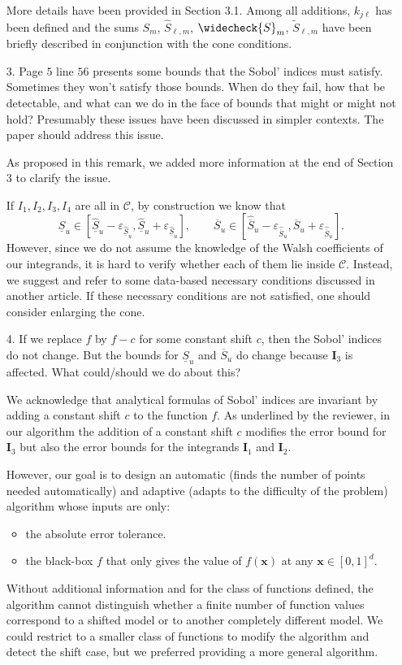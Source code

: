\documentclass[10pt,a4paper]{article}
\newcommand{\vect}[1]{\boldsymbol{\mathbf{#1}}}
\newcommand{\vx}{\vect{x}}
\newcommand{\vI}{\vect{I}}
\newcommand{\hS}{\widehat{S}}
\newcommand{\tS}{\widetilde{S}}
\newcommand{\wcS}{\widecheck{S}}
\newcommand{\answer}[1]{{\color{blue} #1 }}
\begin{document}
\begin{itemize}
\answer{More details have been provided in Section 3.1. Among all additions, $k_{j\ell}$ has been defined and the sums $S_m$, $\hS_{\ell,m}$, $\wcS_m$, $\tS_{\ell,m}$ have been briefly described in conjunction with the cone conditions.}

\item[3.] Page $5$ line $56$ presents some bounds that the Sobol' indices must satisfy. Sometimes they won't satisfy those bounds. When do they fail, how that
be detectable, and what can we do in the face of bounds that might or might not hold? Presumably these issues have been discussed in simpler contexts. The paper should address this issue.

\answer{
As proposed in this remark, we added more information at the end of Section 3 to clarify the issue.

If $I_1, I_2, I_3, I_4$ are all in $\mathcal{C}$, by construction we know that
\[ \underline{S}_u\in \left[ \widehat{\underline{S}}_u - \varepsilon_{\widehat{\underline{S}}_u}, \widehat{\underline{S}}_u + \varepsilon_{\widehat{\underline{S}}_u} \right], \qquad \overline{S}_u\in \left[ \widehat{\overline{S}}_u - \varepsilon_{\widehat{\overline{S}}_u}, \widehat{\overline{S}}_u + \varepsilon_{\widehat{\overline{S}}_u} \right] .\]
However, since we do not assume the knowledge of the Walsh coefficients of our integrands, it is hard to verify whether each of them lie inside $\mathcal{C}$. Instead, we suggest and refer to some data-based necessary conditions discussed in another article. If these necessary conditions are not satisfied, one should consider enlarging the cone.}

\item[4.]If we replace $f$ by $f-c$ for some constant shift $c$, then the Sobol' indices do not change. But the bounds for $\underline{S}_u$ and $\overline{S}_u$ do change because $\vI_3$ is affected. What could/should we do about this?

{\color {blue} We acknowledge that analytical formulas of Sobol' indices are invariant by adding a constant shift $c$ to the function $f$. As underlined by the reviewer, in our algorithm the addition of a constant shift $c$ modifies the error bound for $\vI_3$ but also the error bounds for the integrands $\vI_1$ and $\vI_2$.

However, our goal is to design an automatic (finds the number of points needed automatically) and adaptive (adapts to the difficulty of the problem) algorithm whose inputs are only:
\begin{itemize}
\item the absolute error tolerance.
\item the black-box $f$ that only gives the value of $f(\vx)$ at any $\vx\in [0,1]^d$.
\end{itemize}
Without additional information and for the class of functions defined, the algorithm cannot distinguish whether a finite number of function values correspond to a shifted model or to another completely different model. We could restrict to a smaller class of functions to modify the algorithm and detect the shift case, but we preferred providing a more general algorithm.}



\end{itemize}
\end{document}
